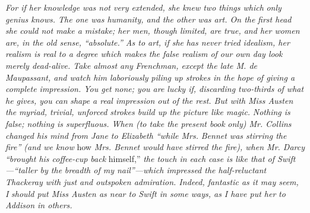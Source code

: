 \documentclass[12pt,openright]{book}
\begin{document}
\textit{For if her knowledge was not very extended, she knew two things which}\textit{ }\textit{only genius knows. The one was humanity, and the other was art. On the}\textit{ }\textit{first head she could not make a mistake; her men, though limited, are}\textit{ }\textit{true, and her women are, in the old sense, “absolute.” As to art, if she}\textit{ }\textit{has never tried idealism, her realism is real to a degree which makes}\textit{ }\textit{the false realism of our own day look merely dead-alive. Take almost any}\textit{ }\textit{Frenchman, except the late M. de Maupassant, and watch him laboriously}\textit{ }\textit{piling up strokes in the hope of giving a complete impression. You get}\textit{ }\textit{none; you are lucky if, discarding two-thirds of what he gives, you can}\textit{ }\textit{shape a real impression out of the rest. But with Miss Austen the}\textit{ }\textit{myriad, trivial, unforced strokes build up the picture like magic.}\textit{ }\textit{Nothing is false; nothing is superfluous. When (to take the present book}\textit{ }\textit{only) Mr. Collins changed his mind from Jane to Elizabeth “while Mrs.}\textit{ }\textit{Bennet was stirring the fire” (and we know} how \textit{Mrs. Bennet would have}\textit{ }\textit{stirred the fire), when Mr. Darcy “brought his coffee-cup back} himself,” \textit{the touch in each case is like that of Swift—“taller by the}\textit{ }\textit{breadth of my nail”—which impressed the half-reluctant Thackeray with}\textit{ }\textit{just and outspoken admiration. Indeed, fantastic as it may seem, I}\textit{ }\textit{should put Miss Austen as near to Swift in some ways, as I have put her}\textit{ }\textit{to Addison in others.}
\end{document}

